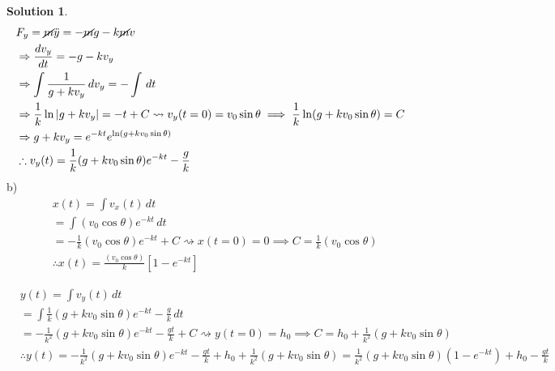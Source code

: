 \documentclass[10pt]{article}
\theoremstyle{definition}
\newtheorem{soln}{Solution}
\begin{document}
\begin{soln}
     \begin{align*}
           & F_y=\cancel{m}\ddot{y}=-\cancel{m}g-k\cancel{m}v                                                                                   \\
           & \Rightarrow \frac{dv_y}{dt}=-g-kv_y                                                                                                \\
           & \Rightarrow \int \frac{1}{g+kv_y} \,dv_y = -\int\,dt                                                                               \\
           & \Rightarrow \frac{1}{k}\ln \abs{g+kv_y} = -t+C \rightsquigarrow v_y(t=0)=v_0\sin\theta \implies \frac{1}{k}\ln(g+kv_0\sin\theta)=C \\
           & \Rightarrow g + kv_y = e^{-kt}e^{\ln(g+kv_0\sin\theta)}                                                                            \\
           & \therefore v_y(t) = \frac{1}{k}(g+kv_0\sin\theta)e^{-kt}-\frac{g}{k}                                                               \\
     \end{align*}
     b) \begin{align*}
           & x(t)=\int v_x(t) \,dt                                                                                 \\
           & = \int (v_0\cos\theta)e^{-kt} \,dt                                                                    \\
           & = -\frac{1}{k}(v_0\cos\theta)e^{-kt}+C\rightsquigarrow x(t=0)=0 \implies C=\frac{1}{k}(v_0\cos\theta) \\
           & \therefore x(t)=\frac{(v_0\cos\theta)}{k}\left[1-e^{-kt}\right]
     \end{align*}

     \begin{align*}
           & y(t)=\int v_y(t) \,dt                                                                                                                                                          \\
           & =\int \frac{1}{k}(g+kv_0\sin\theta)e^{-kt}-\frac{g}{k} \,dt                                                                                                                    \\
           & = -\frac{1}{k^2}(g+kv_0\sin\theta)e^{-kt}-\frac{gt}{k} + C \rightsquigarrow y(t=0)=h_0 \implies C=h_0+\frac{1}{k^2}(g+kv_0\sin\theta)                                          \\
           & \therefore y(t) = -\frac{1}{k^2}(g+kv_0\sin\theta)e^{-kt}-\frac{gt}{k} + h_0 + \frac{1}{k^2}(g+kv_0\sin\theta) = \frac{1}{k^2}(g+kv_0\sin\theta)(1-e^{-kt}) + h_0-\frac{gt}{k} \\
     \end{align*}


\end{soln}
\end{document}
